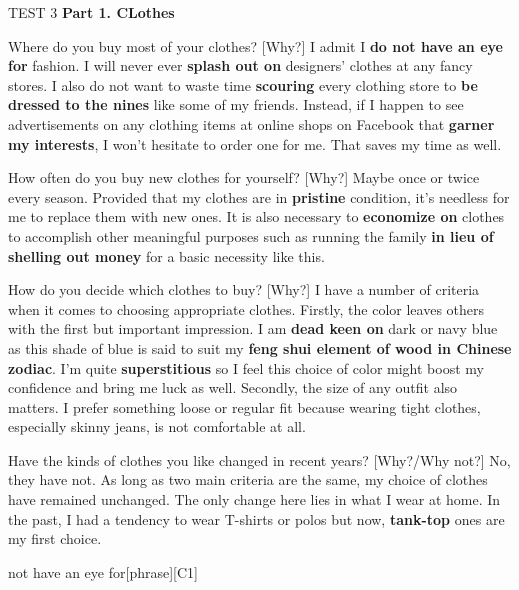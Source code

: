 \begin{glossarymc}[Cambridge 12]
    \begin{test}{TEST 3}
    \noindent
    \textbf{Part 1. CLothes}
    \begin{qa}{Where do you buy most of your clothes? [Why?]}
    I admit I \textbf{do not have an eye for} fashion. I will never ever \textbf{splash out on} designers’ clothes at any fancy stores. I also do not want to waste time \textbf{scouring} every clothing store to \textbf{be dressed to the nines} like some of my friends. Instead, if I happen to see advertisements on any clothing items at online shops on Facebook that \textbf{garner my interests}, I won’t hesitate to order one for me. That saves my time as well.
    \end{qa}

    \begin{qa}{How often do you buy new clothes for yourself? [Why?]}
    Maybe once or twice every season. Provided that my clothes are in \textbf{pristine} condition, it’s needless for me to replace them with new ones. It is also necessary to \textbf{economize on} clothes to accomplish other meaningful purposes such as running the family \textbf{in lieu of shelling out money} for a basic necessity like this.
    \end{qa}

    \begin{qa}{How do you decide which clothes to buy? [Why?]}
    I have a number of criteria when it comes to choosing appropriate clothes. Firstly, the color leaves others with the first but important impression. I am \textbf{dead keen on} dark or navy blue as this shade of blue is said to suit my \textbf{feng shui element of wood in Chinese zodiac}. I’m quite \textbf{superstitious} so I feel this choice of color might boost my confidence and bring me luck as well. Secondly, the size of any outfit also matters. I prefer something loose or regular fit because wearing tight clothes, especially skinny jeans, is not comfortable at all.
    \end{qa}

    \begin{qa}{Have the kinds of clothes you like changed in recent years? [Why?/Why not?]}
    No, they have not. As long as two main criteria are the same, my choice of clothes have remained unchanged. The only change here lies in what I wear at home. In the past, I had a tendency to wear T-shirts or polos but now, \textbf{tank-top} ones are my first choice.
    \end{qa}

        \begin{VocabExplain}[Part 1]
            \begin{ExplainCard}{not have an eye for}[phrase][C1]
            \end{ExplainCard}


\end{VocabExplain}
\end{test}
\end{glossarymc}
